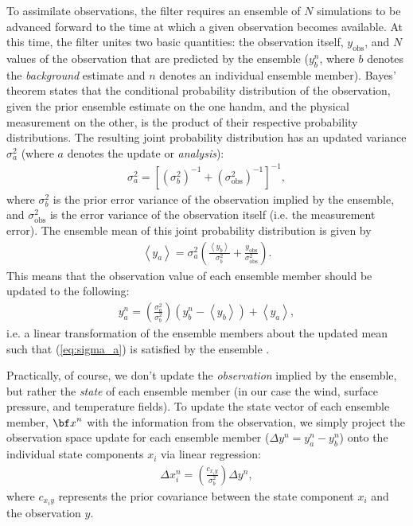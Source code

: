 To assimilate observations, the filter requires an ensemble of $N$ simulations to be advanced forward to the time at which a given observation becomes available. 
At this time, the filter unites two basic quantities: the observation itself, $y_{\text{obs}}$, and $N$ values of the observation that are predicted by the ensemble ($y_{b}^{n}$, where $b$ denotes the \textit{background} estimate and $n$ denotes an individual ensemble member).
Bayes' theorem states that the conditional probability distribution of the observation, given the prior ensemble estimate on the one handm, and the physical measurement on the other, is the product of their respective probability distributions.
The resulting joint probability distribution has an updated variance $\sigma_a^2$  (where $a$ denotes the update or \textit{analysis}):
\begin{eqnarray}
 \sigma_a^2 = 
\left[
\left( \sigma_b^2  \right)^{-1}+
\left( \sigma_{\text{obs}}^2  \right)^{-1}
\right]^{-1},
\label{eq:sigma_a}
\end{eqnarray}
where $\sigma_b^2$ is  the prior error variance of the observation implied by the ensemble, and $\sigma_{\text{obs}}^2$ is the error variance of the observation itself (i.e. the measurement error).
The ensemble mean of this joint probability distribution is given by
\begin{eqnarray}
\left< y_a \right> = \sigma_a^2 
\left(
\frac{\left< y_b \right>}{\sigma_b^2} +
\frac{y_{\text{obs}} }{\sigma_{\text{obs}}^2} 
\right).
\end{eqnarray}
This means that the observation value of each ensemble member should be updated to the following:
\begin{eqnarray}
 y_{a}^n = 
\left( \frac{\sigma_a^2}{\sigma_b^2}  \right)
\left(
y_{b}^n - \left< y_b  \right> \right)
+ \left< y_a \right>,
\end{eqnarray}
i.e. a linear transformation of the ensemble members about the updated mean such that (\ref{eq:sigma_a}) is satisfied by the ensemble \citep{andersoncollins2006}.

Practically, of course, we don't update the \textit{observation} implied by the ensemble, but rather the \textit{state} of each ensemble member (in our case the wind, surface pressure, and temperature fields). 
To update the state vector of each ensemble member, ${\bf x}^n$ with the information from the observation, we simply project the observation space update for each ensemble member ($\Delta y^n = y_{a}^n-y_{b}^n$) onto the individual state components $x_i$ via linear regression:
\begin{eqnarray}
 \Delta x_{i}^n = 
\left(
\frac{c_{x_iy}}{\sigma_b^2}
\right)
\Delta y^n,
\end{eqnarray}
where $c_{x_iy}$ represents the prior covariance between the state component $x_i$ and the observation $y$.

